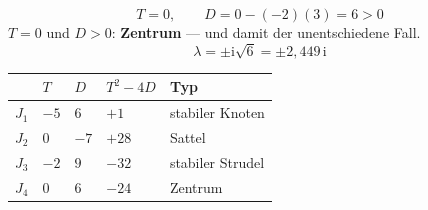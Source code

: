 \begin{aufgabe}
\[ T = 0, \qquad D = 0 - (-2)(3) = 6 > 0 \]
$T=0$ und $D>0$: \textbf{Zentrum} --- und damit der \textcolor{akzent}{unentschiedene Fall}.
\[ \lambda = \pm\mathrm{i}\sqrt{6} = \pm2{,}449\,\mathrm{i} \]

\begin{center}
\begin{minipage}{0.86\textwidth}
\end{minipage}
\end{center}

\begin{center}
\renewcommand{\arraystretch}{1.45}
\begin{tabular}{@{}P{1.2cm}P{1.4cm}P{1.4cm}P{1.6cm}P{2.4cm}@{}}
\toprule
& $T$ & $D$ & $T^2-4D$ & \textbf{Typ}\\
\midrule
$J_1$ & $-5$ & $6$ & $+1$ & stabiler Knoten\\
$J_2$ & $0$ & $-7$ & $+28$ & Sattel\\
$J_3$ & $-2$ & $9$ & $-32$ & stabiler Strudel\\
$J_4$ & $0$ & $6$ & $-24$ & Zentrum\\
\bottomrule
\end{tabular}
\end{center}
\end{aufgabe}

